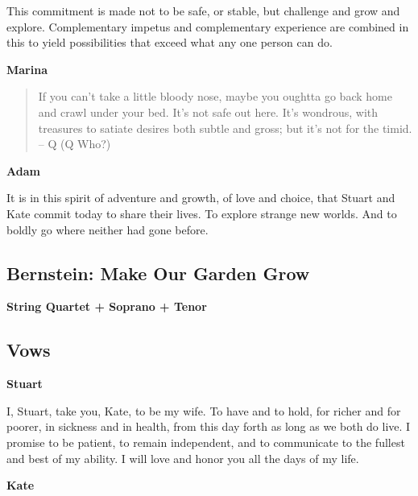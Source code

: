 \documentclass[twoside]{article}
\begin{document}
This commitment is made not to be safe, or stable, but challenge and grow and explore. Complementary impetus and complementary experience are combined in this to yield possibilities that exceed what any one person can do. 
 
        \begin{center}
          \textbf{Marina}
        \end{center}
        \begin{quote} 
          If you can't take a little bloody nose, maybe you oughtta go back home and crawl under your bed. It's not safe out here. It's wondrous, with treasures to satiate desires both subtle and gross; but it's not for the timid.
          \\
          -- Q (Q Who?)
        \end{quote}

        \begin{center}
          \textbf{Adam}
        \end{center}

It is in this spirit of adventure and growth, of love and choice, that Stuart and Kate commit today to share their lives. To explore strange new worlds. And to boldly go where neither had gone before.

      \subsection{Bernstein: Make Our Garden Grow}
        \begin{center}
         \textbf{String Quartet + Soprano + Tenor}
        \end{center}

  	   \subsection{Vows}
         \begin{center}
           \textbf{Stuart}
         \end{center}
          
I, Stuart, take you, Kate, to be my wife. To have and to hold, for richer and for poorer, in sickness and in health, from this day forth as long as we both do live. I promise to be patient, to remain independent, and to communicate to the fullest and best of my ability. I will love and honor you all the days of my life.
	
          \begin{center}
           \textbf{Kate}
          \end{center}
          
\end{document}
